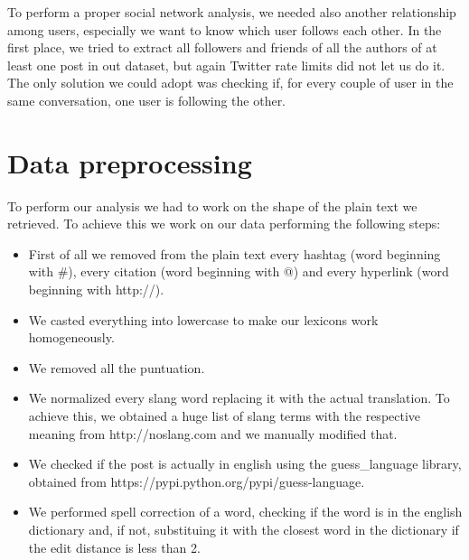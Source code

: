 \documentclass[a4paper,10pt, english]{report}
\begin{document}
To perform a proper social network analysis, we needed also another relationship among users, especially we want to know which user follows each other. 
In the first place, we tried to extract all followers and friends of all the authors of at least one post in out dataset, but again Twitter rate limits did not let us do it.
The only solution we could adopt was checking if, for every couple of user in the same conversation, one user is following the other.

\section{Data preprocessing}
To perform our analysis we had to work on the shape of the plain text we retrieved.
To achieve this we work on our data performing the following steps:
 \begin{itemize}
  \item First of all we removed from the plain text every hashtag (word beginning with \#), every citation (word beginning with @) and every hyperlink (word beginning with http://).
  \item We casted everything into lowercase to make our lexicons work homogeneously.
  \item We removed all the puntuation.
  \item We normalized every slang word replacing it with the actual translation. To achieve this, we obtained a huge list of slang terms with the respective meaning from http://noslang.com and we manually modified that.
  \item We checked if the post is actually in english using the guess\_language library, obtained from https://pypi.python.org/pypi/guess-language.
  \item We performed spell correction of a word, checking if the word is in the english dictionary and, if not, substituing it with the closest word in the dictionary if the edit distance is less than 2.
 \end{itemize}
\end{document}
